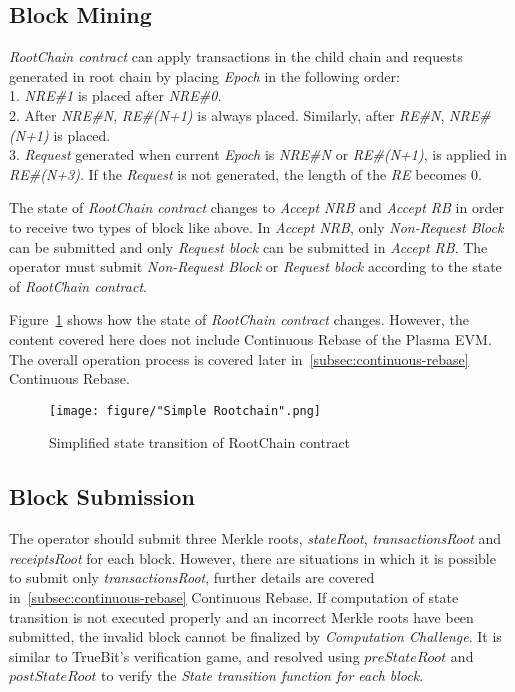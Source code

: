 \documentclass[letterpaper, 11pt]{article}
\begin{document}
\subsection{Block Mining} \label{subsec:blockmining}
\begin{CJK}{UTF8}{mj}
\emph{RootChain contract} can apply transactions in the child chain and requests generated in root chain by placing \emph{Epoch} in the following order: \\
1. \emph{NRE\#1} is placed after \emph{NRE\#0}. \\
2. After \emph{NRE\#N}, \emph{RE\#(N+1)} is always placed. Similarly, after \emph{RE\#N}, \emph{NRE\#(N+1)} is placed. \\
3. \emph{Request} generated when current \emph{Epoch} is \emph{NRE\#N} or \emph{RE\#(N+1)}, is applied in \emph{RE\#(N+3)}. If the \emph{Request} is not generated, the length of the \emph{RE} becomes 0.

\bigskip
The state of \emph{RootChain contract} changes to \emph{Accept NRB} and \emph{Accept RB} in order to receive two types of block like above. In \emph{Accept NRB}, only \emph{Non-Request Block} can be submitted and only \emph{Request block} can be submitted in \emph{Accept RB}. The operator must submit \emph{Non-Request Block} or \emph{Request block} according to the state of \emph{RootChain contract}.

Figure~\ref{fig:simple-state-transition-diagram} shows how the state of \emph{RootChain contract} changes. However, the content covered here does not include Continuous Rebase of the Plasma EVM. The overall operation process is covered later in~\ref{subsec:continuous-rebase} Continuous Rebase.

\begin{figure}[!h]
\centering
\texttt{[image: figure/"Simple Rootchain".png]}
\caption{Simplified state transition of RootChain contract}
\label{fig:simple-state-transition-diagram}
\end{figure}

\end{CJK}

\subsection{Block Submission}
\begin{CJK}{UTF8}{mj}
The operator should submit three Merkle roots, \emph{stateRoot}, \emph{transactionsRoot} and \emph{receiptsRoot} for each block. However, there are situations in which it is possible to submit only \emph{transactionsRoot}, further details are covered in~\ref{subsec:continuous-rebase} Continuous Rebase. If computation of state transition is not executed properly and an incorrect Merkle roots have been submitted, the invalid block cannot be finalized by \emph{Computation Challenge}. It is similar to TrueBit's verification game, and resolved using $preStateRoot$ and $postStateRoot$ to verify the \emph{State transition function for each block}.
\end{CJK}
\end{document}
